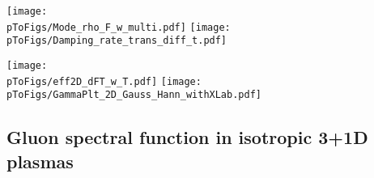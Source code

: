 \documentclass[]{webofc}
\newcommand{\mrm}{\mathrm}
\newcommand{\wplas}{\omega_{\mrm{pl}}}
\newcommand{\fig}{Fig.~}
\newcommand{\re}{Ref.~}
\newcommand{\pToFigs}{.}
\begin{document}
\begin{figure*}[t]
\centering
\texttt{[image: \\pToFigs/Mode\_rho\_F\_w\_multi.pdf]}
\qquad
\texttt{[image: \\pToFigs/Damping\_rate\_trans\_diff\_t.pdf]}
\caption{{\bf Gluonic} simulation results in a {\bf 3+1D} plasma. 
{\em Left:} The spectral function at different momentum modes as a function of $\omega$. In contrast to the right panel of \fig\ref{fig:rho_dt_w}, we show only the positive frequency part for the gluon spectral function, which agrees with the values at negative frequency due to $\dot\rho_T(t,-\omega,p) = \dot\rho_T(t,\omega,p)$.
{\em Right:} The extracted damping rate at different times as a function of momentum, rescaled by powers of time (main plot) and without rescaling (inset). Figures taken from \re\cite{Boguslavski:2018beu}.
}
\label{fig:rho_3D}       %
\end{figure*}

\begin{figure*}[t]
\centering
\texttt{[image: \\pToFigs/eff2D\_dFT\_w\_T.pdf]}
\qquad
\texttt{[image: \\pToFigs/GammaPlt\_2D\_Gauss\_Hann\_withXLab.pdf]}
\caption{{\bf Gluonic} simulation results in {\bf 2+1D} plasmas.
{\em Left:} The transversely polarized spectral function at different momentum modes as a function of $\omega$ for a 2+1D (left) and a 2+1D simulation coupled to an adjoint scalar field (right). 
{\em Right:} The extracted damping rate of the genuinely 2+1D plasma at different times as a function of momentum, rescaled by the time-dependent plasmon mass $\wplas(t)$ (main plot) and without rescaling (inset). Figures taken from \re\cite{Boguslavski:2021buh}.
}
\label{fig:rho_2D}       %
\end{figure*}




\subsection{Gluon spectral function in isotropic 3+1D plasmas}
\label{sec:gluon_rho_3D}
\end{document}
